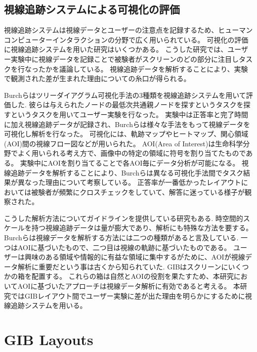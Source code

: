 \documentclass{kuee}
\begin{document}
\section{視線追跡システムによる可視化の評価}
\label{sec:evaluation_with_eyetracking}
視線追跡システムは視線データとユーザーの注意点を記録するため、ヒューマンコンピューターインタラクションの分野で広く用いられている\cite{andrienko2012visual,duchowski2007eye,kurzhals2014evaluating}。
可視化の評価に視線追跡システムを用いた研究はいくつかある\cite{burch2011evaluation,pohl2009comparing,netzel2014comparative,jianu2014display,7539393}。
こうした研究では、ユーザー実験中に視線データを記録ことで被験者がスクリーンのどの部分に注目しタスクを行なったかを議論している。
視線追跡データを解析することにより、実験で観測された差が生まれた理由についての糸口が得られる。

Burchらはツリーダイアグラム可視化手法の3種類を視線追跡システムを用いて評価した\cite{burch2011evaluation}.
彼らは与えられたノードの最低次共通親ノードを探すというタスクを探すというタスクを用いてユーザー実験を行なった。
実験中は正答率と完了時間に加え視線追跡データが記録され、Burchらは様々な手法をもって視線データを可視化し解析を行なった。
可視化には、軌跡マップやヒートマップ、関心領域(AOI)間の視線フロー図などが用いられた。
AOI(Area of Interest)は生命科学分野でよく用いられる考え方で、画像中の特定の領域に符号を割り当てたものである。
実験中にAOIを割り当てることで各AOI毎にデータ分析が可能になる。
視線追跡データを解析することにより、Burchらは異なる可視化手法間でタスク結果が異なった理由について考察している。
正答率が一番低かったレイアウトにおいては被験者が頻繁にクロスチェックをしていて、解答に迷っている様子が観察された。

こうした解析方法についてガイドラインを提供している研究もある\cite{andrienko2012visual,kurzhals2014evaluating,duchowski2007eye}.
時空間的スケールを持つ視線追跡データは量が膨大であり、解析にも特殊な方法を要する。
Burchらは視線データを解析する方法には二つの種類があると言及している\cite{Burch2013VisualTS}.
一つはAOIに基づいたもので、二つ目は視線の軌跡に基づいたものである。
ユーザーは興味のある領域や情報的に有益な領域に集中するがために、AOIが視線データ解析に重要だという事は古くから知られていた\cite{yarbus1967eye}.
GIBはスクリーンにいくつかの箱を配置する。
これらの箱は自然とAOIの役割を果たすため、本研究においてAOIに基づいたアプローチは視線データ解析に有効であると考える。
本研究ではGIBレイアウト間でユーザー実験に差が出た理由を明らかにするために視線追跡システムを用いる。

\chapter{GIB Layouts}
\label{chap:GIBs}
\end{document}
